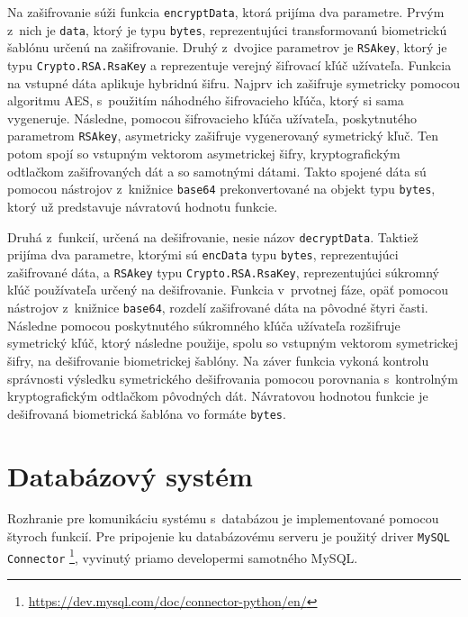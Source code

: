  
Na zašifrovanie súži funkcia \texttt{encryptData}, ktorá prijíma dva parametre. Prvým z~nich je \texttt{data}, ktorý je typu \texttt{bytes}, reprezentujúci transformovanú biometrickú šablónu určenú na zašifrovanie. Druhý z~dvojice parametrov je \texttt{RSAkey}, ktorý je typu \texttt{Crypto.RSA.RsaKey} a reprezentuje verejný šifrovací kľúč užívateľa. Funkcia na vstupné dáta aplikuje hybridnú šifru. Najprv ich zašifruje symetricky pomocou algoritmu AES, s~použitím náhodného šifrovacieho kľúča, ktorý si sama vygeneruje. Následne, pomocou šifrovacieho kľúča užívateľa, poskytnutého parametrom \texttt{RSAkey}, asymetricky zašifruje vygenerovaný symetrický kľuč. Ten potom spojí so vstupným vektorom asymetrickej šifry, kryptografickým odtlačkom zašifrovaných dát a so samotnými dátami. Takto spojené dáta sú pomocou nástrojov z~knižnice \texttt{base64} prekonvertované na objekt typu \texttt{bytes}, ktorý už predstavuje návratovú hodnotu funkcie.
 
Druhá z~funkcií, určená na dešifrovanie, nesie názov \texttt{decryptData}. Taktiež prijíma dva parametre, ktorými sú \texttt{encData} typu \texttt{bytes}, reprezentujúci zašifrované dáta, a \texttt{RSAkey} typu \texttt{Crypto.RSA.RsaKey}, reprezentujúci súkromný kľúč používateľa určený na dešifrovanie. Funkcia v~prvotnej fáze, opäť pomocou nástrojov z~knižnice \texttt{base64}, rozdelí zašifrované dáta na pôvodné štyri časti. Následne pomocou poskytnutého súkromného kľúča užívateľa rozšifruje symetrický kľúč, ktorý následne použije, spolu so vstupným vektorom symetrickej šifry, na dešifrovanie biometrickej šablóny. Na záver funkcia vykoná kontrolu správnosti výsledku symetrického dešifrovania pomocou porovnania s~kontrolným kryptografickým odtlačkom pôvodných dát. Návratovou hodnotou funkcie je dešifrovaná biometrická šablóna vo formáte \texttt{bytes}.

\section{Databázový systém}
Rozhranie pre komunikáciu systému s~databázou je implementované pomocou štyroch funkcií. Pre pripojenie ku databázovému serveru je použitý driver \texttt{MySQL Connector} \footnote{\url{https://dev.mysql.com/doc/connector-python/en/}}, vyvinutý priamo developermi samotného MySQL.


